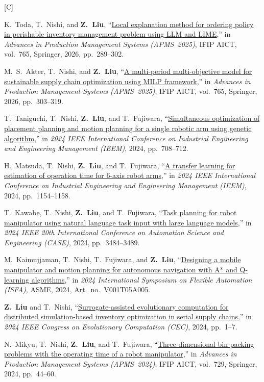 \documentclass[11pt,a4paper]{article}
\newcommand{\doititle}[2]{\href{https://doi.org/#1}{#2}}
\newlength{\datecol}
\newcounter{pubno}
\newenvironment{publist}[1]{%
  \begin{list}{[#1\arabic{pubno}]}{%
    \usecounter{pubno}%
    \setlength{\leftmargin}{\datecol}%
    \setlength{\labelwidth}{\datecol}%
    \setlength{\labelsep}{0pt}%
    \setlength{\itemsep}{3pt}%
    \setlength{\parsep}{0pt}%
    \setlength{\topsep}{2pt}%
    \renewcommand{\makelabel}[1]{##1\hfil}}}%
  {\end{list}}
\begin{document}
\begin{publist}{C}
\item K.~Toda, T.~Nishi, and \textbf{Z.~Liu}, ``\doititle{10.1007/978-3-032-03534-9_20}{Local explanation method for ordering policy in perishable inventory management problem using {LLM} and {LIME}},'' in \textit{Advances in Production Management Systems (APMS~2025)}, IFIP AICT, vol.~765, Springer, 2026, pp.~289--302.
\item M.~S.~Akter, T.~Nishi, and \textbf{Z.~Liu}, ``\doititle{10.1007/978-3-032-03534-9_21}{A multi-period multi-objective model for sustainable supply chain optimization using {MILP} framework},'' in \textit{Advances in Production Management Systems (APMS~2025)}, IFIP AICT, vol.~765, Springer, 2026, pp.~303--319.
\item T.~Taniguchi, T.~Nishi, \textbf{Z.~Liu}, and T.~Fujiwara, ``\doititle{10.1109/ieem62345.2024.10857105}{Simultaneous optimization of placement planning and motion planning for a single robotic arm using genetic algorithm},'' in \textit{2024 IEEE International Conference on Industrial Engineering and Engineering Management (IEEM)}, 2024, pp.~708--712.
\item H.~Matsuda, T.~Nishi, \textbf{Z.~Liu}, and T.~Fujiwara, ``\doititle{10.1109/ieem62345.2024.10857125}{A transfer learning for estimation of operation time for 6-axis robot arms},'' in \textit{2024 IEEE International Conference on Industrial Engineering and Engineering Management (IEEM)}, 2024, pp.~1154--1158.
\item T.~Kawabe, T.~Nishi, \textbf{Z.~Liu}, and T.~Fujiwara, ``\doititle{10.1109/case59546.2024.10711671}{Task planning for robot manipulator using natural language task input with large language models},'' in \textit{2024 IEEE 20th International Conference on Automation Science and Engineering (CASE)}, 2024, pp.~3484--3489.
\item M.~Kaimujjaman, T.~Nishi, T.~Fujiwara, and \textbf{Z.~Liu}, ``\doititle{10.1115/isfa2024-141112}{Designing a mobile manipulator and motion planning for autonomous navigation with {A}* and {Q}-learning algorithms},'' in \textit{2024 International Symposium on Flexible Automation (ISFA)}, ASME, 2024, Art.~no.~V001T05A005.
\item \textbf{Z.~Liu} and T.~Nishi, ``\doititle{10.1109/cec60901.2024.10612189}{Surrogate-assisted evolutionary computation for distributed simulation-based inventory optimization in serial supply chains},'' in \textit{2024 IEEE Congress on Evolutionary Computation (CEC)}, 2024, pp.~1--7.
\item N.~Mikyu, T.~Nishi, \textbf{Z.~Liu}, and T.~Fujiwara, ``\doititle{10.1007/978-3-031-65894-5_4}{Three-dimensional bin packing problems with the operating time of a robot manipulator},'' in \textit{Advances in Production Management Systems (APMS~2024)}, IFIP AICT, vol.~729, Springer, 2024, pp.~44--60.

\end{publist}
\end{document}
